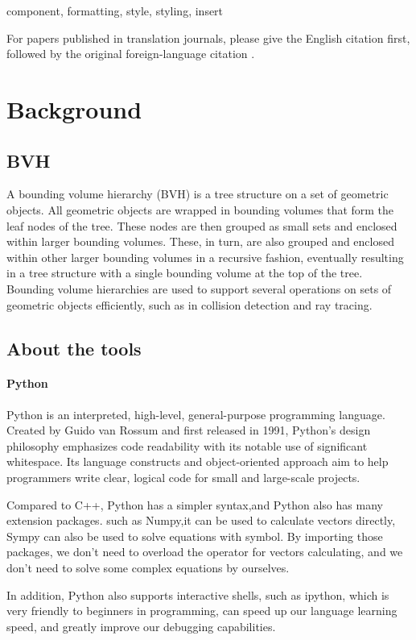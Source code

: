 \documentclass[conference]{IEEEtran}
\begin{document}
\begin{IEEEkeywords}
component, formatting, style, styling, insert
\end{IEEEkeywords}
For papers published in translation journals, please give the English 
citation first, followed by the original foreign-language citation \cite{b6}.

\section{Background}
\subsection{BVH}
A bounding volume hierarchy (BVH) is a tree structure on a set of geometric objects. 
All geometric objects are wrapped in bounding volumes that form the leaf nodes of the tree. 
These nodes are then grouped as small sets and enclosed within larger bounding volumes. 
These, in turn, are also grouped and enclosed within other larger bounding volumes in a recursive fashion, 
eventually resulting in a tree structure with a single bounding volume at the top of the tree. 
Bounding volume hierarchies are used to support several operations on sets of geometric objects efficiently, such as in collision detection and ray tracing. 
\subsection{About the tools}
\paragraph{Python}

Python is an interpreted, high-level, general-purpose programming language. 
Created by Guido van Rossum and first released in 1991, Python's design philosophy emphasizes code readability with its notable use of significant whitespace. 
Its language constructs and object-oriented approach aim to help programmers write clear, logical code for small and large-scale projects.\cite{python1}

Compared to C++, Python has a simpler syntax,and Python also has many extension packages. such as Numpy,it can be used to calculate vectors directly,
Sympy can also be used to solve equations with symbol. By importing those packages, we don't need to overload the operator for vectors calculating, and we don't need to
solve some complex equations by ourselves.

In addition, Python also supports interactive shells, such as ipython, which is very friendly to beginners in programming, 
can speed up our language learning speed, and greatly improve our debugging capabilities.
\end{document}
